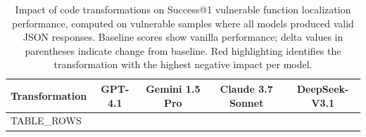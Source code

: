 \begin{table}[htbp]
\centering
\caption{Impact of code transformations on Success@1 vulnerable function localization performance, computed on vulnerable samples where all models produced valid JSON responses. Baseline scores show vanilla performance; delta values in parentheses indicate change from baseline. Red highlighting identifies the transformation with the highest negative impact per model.}
\label{tab:transformation_impact}
\begin{tabular}{lcccc}
\toprule
\textbf{Transformation} & \textbf{GPT-4.1} & \textbf{Gemini 1.5 Pro} & \textbf{Claude 3.7 Sonnet} & \textbf{DeepSeek-V3.1} \\
\midrule
{TABLE_ROWS}
\bottomrule
\end{tabular}
\end{table}